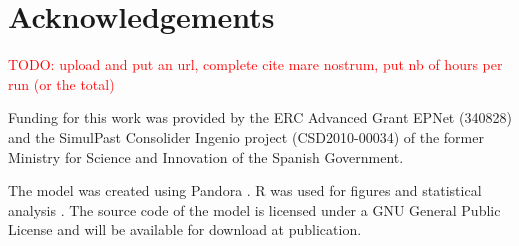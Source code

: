 \documentclass{wscpaperproc}
\newcommand{\memo}[2]{\textcolor{#1}{#2}}
\newcommand{\todo}[1]{\memo{red}{TODO: #1\\}}
\begin{document}
\section{Acknowledgements}

\todo{upload and put an url, complete cite mare nostrum, put nb of hours per run (or the total)}

Funding for this work was provided by the ERC Advanced Grant EPNet (340828) and the SimulPast Consolider Ingenio project (CSD2010-00034) of the former Ministry for Science and Innovation of the Spanish Government. 

The model was created using Pandora . R was used for figures and statistical analysis . The source code of the model is licensed under a GNU General Public License and will be available for download at publication.


  
\end{document}

